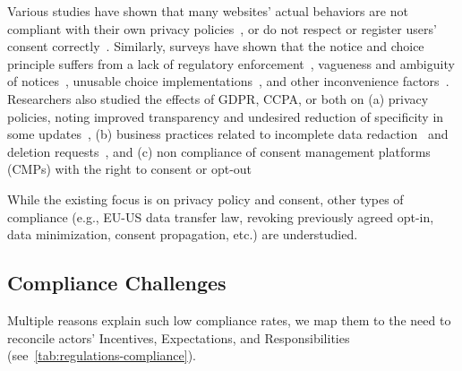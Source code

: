  Various studies have shown that many websites' actual behaviors are not compliant with their own privacy policies~\cite{libertAutomatedApproachAuditing2018,ouViopolicyDetectorAutomatedApproach2022,manandharAutomatedRegulationAnalysis2024}, or do not respect or register users’ consent correctly~\cite{carpinetoAutomaticAssessmentWebsite2016,sanchezrolaCanIOptOutYet2019,matteCookieBannersRespect2020,mehrnezhadCrossPlatformEvaluationPrivacy2020,bouhoulaAutomatedLargeScaleAnalysis2024,vannortwickSettingBarLow2022,birrellSoKTechnicalImplementation2024,Kanc-etal-25-PETs,liuOptedOutTracked2024}.
%
Similarly, surveys have shown that the notice and choice principle suffers from a lack of regulatory enforcement~\cite{cranorNecessaryNotSufficient2012}, vagueness and ambiguity of notices~\cite{reidenbergAmbiguityPrivacyPolicies2016}, unusable choice implementations~\cite{habibItsScavengerHunt2020}, and other inconvenience factors~\cite{oconnorUnclearInconspicuousRight2021}.
%
Researchers also studied the effects of GDPR, CCPA, or both on (a) privacy policies, noting improved transparency and undesired reduction of specificity in some updates~\cite{lindenPrivacyPolicyLandscape2020,hosseiniBilingualLongitudinalAnalysis2024,cuiUnderstandingPrivacyNorms2025}, (b) business practices related to incomplete data redaction~\cite{luWHOISWHOWASLargeScale2021} and deletion requests~\cite{ruppLeaveNoData2022,dimartinoRevisitingIdentificationIssues2022,mehrnezhadHowCanWould2022,jordanVICEROYGDPRCCPAcompliant2023}, and (c) non compliance of consent management platforms (CMPs) with the right to consent or opt-out~\cite{azizJohnnyStillCant2024,papadogiannakisUserTrackingPostcookie2021,bollingerAutomatingCookieConsent2022,tothDarkPatternsManipulation2022,biselliSupportingInformedChoices2024}


\begin{opbox}
While the existing focus is on privacy policy and consent, other types of compliance (e.g., EU-US data transfer law, revoking previously agreed opt-in, data minimization, consent propagation, etc.) are understudied.
\end{opbox}

\subsection{Compliance Challenges}

Multiple reasons explain such low compliance rates, we map them to the need to reconcile actors' \colorbox{cellpink}{Incentives}, \colorbox{cellblue}{Expectations}, and \colorbox{cellgreen}{Responsibilities} (see~\autoref{tab:regulations-compliance}).

